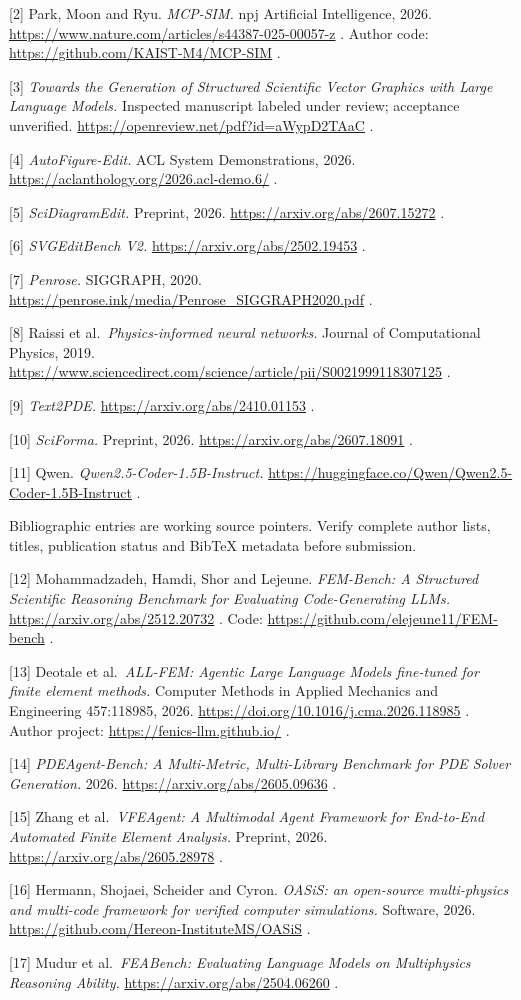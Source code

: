 \documentclass[
  11pt,
  a4paper,
]{article}
\begin{document}
{[}2{]} Park, Moon and Ryu. \emph{MCP-SIM.} npj Artificial Intelligence,
2026. \url{https://www.nature.com/articles/s44387-025-00057-z} . Author
code: \url{https://github.com/KAIST-M4/MCP-SIM} .

{[}3{]} \emph{Towards the Generation of Structured Scientific Vector
Graphics with Large Language Models.} Inspected manuscript labeled under
review; acceptance unverified.
\url{https://openreview.net/pdf?id=aWypD2TAaC} .

{[}4{]} \emph{AutoFigure-Edit.} ACL System Demonstrations, 2026.
\url{https://aclanthology.org/2026.acl-demo.6/} .

{[}5{]} \emph{SciDiagramEdit.} Preprint, 2026.
\url{https://arxiv.org/abs/2607.15272} .

{[}6{]} \emph{SVGEditBench V2.} \url{https://arxiv.org/abs/2502.19453} .

{[}7{]} \emph{Penrose.} SIGGRAPH, 2020.
\url{https://penrose.ink/media/Penrose_SIGGRAPH2020.pdf} .

{[}8{]} Raissi et al.~\emph{Physics-informed neural networks.} Journal
of Computational Physics, 2019.
\url{https://www.sciencedirect.com/science/article/pii/S0021999118307125}
.

{[}9{]} \emph{Text2PDE.} \url{https://arxiv.org/abs/2410.01153} .

{[}10{]} \emph{SciForma.} Preprint, 2026.
\url{https://arxiv.org/abs/2607.18091} .

{[}11{]} Qwen. \emph{Qwen2.5-Coder-1.5B-Instruct.}
\url{https://huggingface.co/Qwen/Qwen2.5-Coder-1.5B-Instruct} .

Bibliographic entries are working source pointers. Verify complete
author lists, titles, publication status and BibTeX metadata before
submission.

{[}12{]} Mohammadzadeh, Hamdi, Shor and Lejeune. \emph{FEM-Bench: A
Structured Scientific Reasoning Benchmark for Evaluating Code-Generating
LLMs.} \url{https://arxiv.org/abs/2512.20732} . Code:
\url{https://github.com/elejeune11/FEM-bench} .

{[}13{]} Deotale et al.~\emph{ALL-FEM: Agentic Large Language Models
fine-tuned for finite element methods.} Computer Methods in Applied
Mechanics and Engineering 457:118985, 2026.
\url{https://doi.org/10.1016/j.cma.2026.118985} . Author project:
\url{https://fenics-llm.github.io/} .

{[}14{]} \emph{PDEAgent-Bench: A Multi-Metric, Multi-Library Benchmark
for PDE Solver Generation.} 2026. \url{https://arxiv.org/abs/2605.09636}
.

{[}15{]} Zhang et al.~\emph{VFEAgent: A Multimodal Agent Framework for
End-to-End Automated Finite Element Analysis.} Preprint, 2026.
\url{https://arxiv.org/abs/2605.28978} .

{[}16{]} Hermann, Shojaei, Scheider and Cyron. \emph{OASiS: an
open-source multi-physics and multi-code framework for verified computer
simulations.} Software, 2026.
\url{https://github.com/Hereon-InstituteMS/OASiS} .

{[}17{]} Mudur et al.~\emph{FEABench: Evaluating Language Models on
Multiphysics Reasoning Ability.} \url{https://arxiv.org/abs/2504.06260}
.
\end{document}
